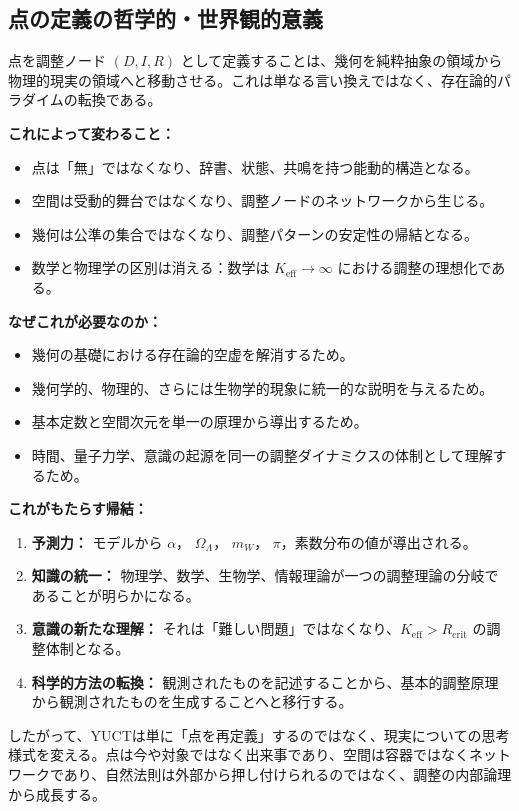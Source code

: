 \documentclass[12pt,a4paper]{article}
\newcommand{\Keff}{K_{\mathrm{eff}}}
\newcommand{\Rcrit}{R_{\mathrm{crit}}}
\begin{document}
	\subsection*{点の定義の哲学的・世界観的意義}
	
	点を調整ノード \((D, I, R)\) として定義することは、幾何を純粋抽象の領域から物理的現実の領域へと移動させる。これは単なる言い換えではなく、存在論的パラダイムの転換である。
	
	\medskip
	\textbf{これによって変わること：}
	\begin{itemize}
		\item 点は「無」ではなくなり、辞書、状態、共鳴を持つ能動的構造となる。
		\item 空間は受動的舞台ではなくなり、調整ノードのネットワークから生じる。
		\item 幾何は公準の集合ではなくなり、調整パターンの安定性の帰結となる。
		\item 数学と物理学の区別は消える：数学は \(\Keff \to \infty\) における調整の理想化である。
	\end{itemize}
	
	\medskip
	\textbf{なぜこれが必要なのか：}
	\begin{itemize}
		\item 幾何の基礎における存在論的空虚を解消するため。
		\item 幾何学的、物理的、さらには生物学的現象に統一的な説明を与えるため。
		\item 基本定数と空間次元を単一の原理から導出するため。
		\item 時間、量子力学、意識の起源を同一の調整ダイナミクスの体制として理解するため。
	\end{itemize}
	
	\medskip
	\textbf{これがもたらす帰結：}
	\begin{enumerate}
		\item \textbf{予測力：} モデルから \(\alpha\)， \(\Omega_\Lambda\)， \(m_W\)， \(\pi\)，素数分布の値が導出される。
		\item \textbf{知識の統一：} 物理学、数学、生物学、情報理論が一つの調整理論の分岐であることが明らかになる。
		\item \textbf{意識の新たな理解：} それは「難しい問題」ではなくなり、\(\Keff > \Rcrit\) の調整体制となる。
		\item \textbf{科学的方法の転換：} 観測されたものを記述することから、基本的調整原理から観測されたものを生成することへと移行する。
	\end{enumerate}
	
	\medskip
	したがって、YUCTは単に「点を再定義」するのではなく、現実についての思考様式を変える。点は今や対象ではなく出来事であり、空間は容器ではなくネットワークであり、自然法則は外部から押し付けられるのではなく、調整の内部論理から成長する。
	
\end{document}
